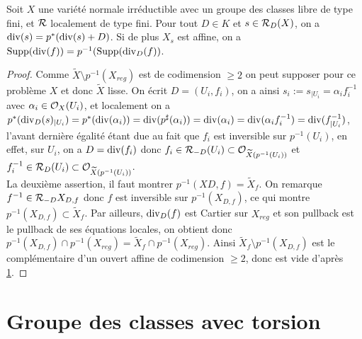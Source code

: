 \begin{prop}
Soit $X$ une variété normale irréductible avec un groupe des classes libre de type fini, et $\mathcal{R}$ localement de type fini. Pour tout $D\in K$ et $s\in\mathcal{R}_D(X)$, on a $\operatorname{div}(s)=p^*(\operatorname{div}(s)+D)$. Si de plus $X_s$ est affine, on a $\operatorname{Supp}(\operatorname{div}(f))=p^{-1}(\operatorname{Supp}(\operatorname{div}_D(f))$.
\end{prop}
\begin{proof}
Comme $\widetilde{X}\setminus p^{-1}(X_{reg})$ est de codimension $\geq 2$ on peut supposer pour ce problème $X$ et donc $\widetilde{X}$ lisse. On écrit $D=(U_i, f_i)$, on a ainsi $s_i:=s_{|U_i}=\alpha_i f_i^{-1}$ avec $\alpha_i\in \mathcal{O}_X(U_i)$, et localement on a $p^*(\operatorname{div}_D(s)_{|U_i})=p^*(\operatorname{div}(\alpha_i))=\operatorname{div}(p^\sharp(\alpha_i))=\operatorname{div}(\alpha_i)=\operatorname{div}(\alpha_i f_i^{-1})=\operatorname{div}(f^{-1}_{|U_i})$, l'avant dernière égalité étant due au fait que $f_i$ est inversible sur $p^{-1}(U_i)$, en effet, sur $U_i$, on a $D=\operatorname{div}(f_i)$ donc $f_i\in \mathcal{R}_{-D}(U_i)\subset\mathcal{O}_{\widetilde{X}(p^{-1}(U_i))}$ et $f_i^{-1}\in \mathcal{R}_D(U_i)\subset\mathcal{O}_{\widetilde{X}(p^{-1}(U_i))}$.\\
La deuxième assertion, il faut montrer $p^{-1}(X{D,f})=\widetilde{X}_f$. On remarque $f^{-1}\in \mathcal{R}_{-D}{X_{D,f}}$ donc $f$ est inversible sur $p^{-1}(X_{D,f})$, ce qui montre $p^{-1}(X_{D,f})\subset \widetilde{X}_f$. Par ailleurs, $\operatorname{div}_D(f)$ est Cartier sur $X_{reg}$ et son pullback est le pullback de ses équations locales, on obtient donc $p^{-1}(X_{D,f})\cap p^{-1}(X_{reg})=\widetilde{X}_f \cap p^{-1}(X_{reg})$. Ainsi $\widetilde{X}_f \setminus p^{-1}(X_{D,f})$ est le complémentaire d'un ouvert affine de codimension $\geq 2$, donc est vide d'après \ref{}.
\end{proof}


\section{Groupe des classes avec torsion}
